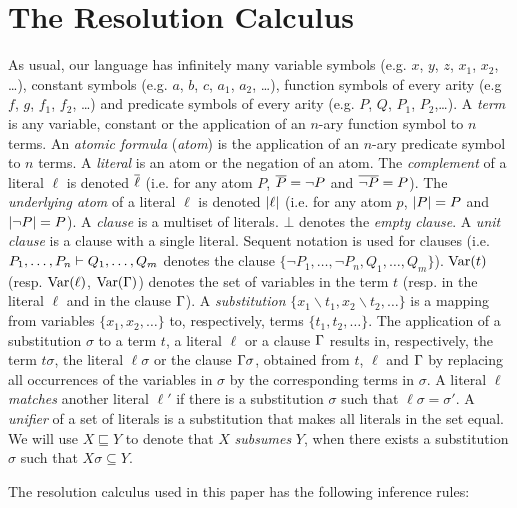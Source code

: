\section{The Resolution Calculus}
\label{sec:res}

As usual, our language has infinitely many variable symbols (e.g. $x$, $y$, $z$, $x_1$, $x_2$, \ldots), constant symbols (e.g. $a$, $b$, $c$, $a_1$, $a_2$, \ldots), function symbols of every arity (e.g $f$, $g$, $f_1$, $f_2$, \ldots) and predicate symbols of every arity (e.g. $P$, $Q$, $P_1$, $P_2$,\ldots). A \emph{term} is any variable, constant or the application of an $n$-ary function symbol to $n$ terms.
An \emph{atomic formula} (\emph{atom}) is the application of an $n$-ary predicate symbol to $n$ terms. A \emph{literal} is an atom or the negation of an atom. The
\emph{complement} of a literal $\ell$ is denoted $\overline{\ell}$ (i.e. for any atom $P$,
$\overline{P} = \neg P$ and $\overline{\neg P} = P$). The \emph{underlying atom} of a literal $\ell$ is denoted $\lvert\ell\rvert$ (i.e. for any atom $p$, $\lvert P\rvert = P$ and $\lvert\neg P\rvert = P$). A
\emph{clause} is a multiset of literals. $\bot$ denotes the \emph{empty clause}. A \emph{unit clause} is a clause with a single literal. Sequent notation is used for clauses (i.e. $P_1,\ldots,P_n \vdash Q_1,\ldots, Q_m$ denotes the clause $\{ \neg P_1,\ldots, \neg P_n, Q_1, \ldots, Q_m \}$).
$\mathrm{Var}(t)$ (resp. $\mathrm{Var}(\ell)$, $\mathrm{Var}(\Gamma)$) denotes the set of variables in the term $t$ (resp. in the literal $\ell$ and in the clause $\Gamma$).
A \emph{substitution} $\{ x_1\backslash t_1, x_2 \backslash t_2, \ldots \}$ is a mapping from variables $\{ x_1, x_2, \ldots \}$ to, respectively, terms $\{t_1, t_2, \ldots \}$. The application of a substitution $\sigma$ to a term $t$, a literal $\ell$ or a clause $\Gamma$ results in, respectively, the term $t \sigma$, the literal $\ell \sigma$ or the clause $\Gamma \sigma$, obtained from $t$, $\ell$ and $\Gamma$ by replacing all occurrences of the variables in $\sigma$ by the corresponding terms in $\sigma$. A literal $\ell$ \emph{matches} another literal $\ell'$ if there is a substitution $\sigma$ such that $\ell\sigma=\sigma'$. A \emph{unifier} of a set of literals is a substitution that makes all literals in the set equal. We will use $X \sqsubseteq Y$ to denote that $X$ \emph{subsumes} $Y$, when there exists a substitution $\sigma$ such that $X\sigma \subseteq Y$.

The resolution calculus used in this paper has the following inference rules: 



